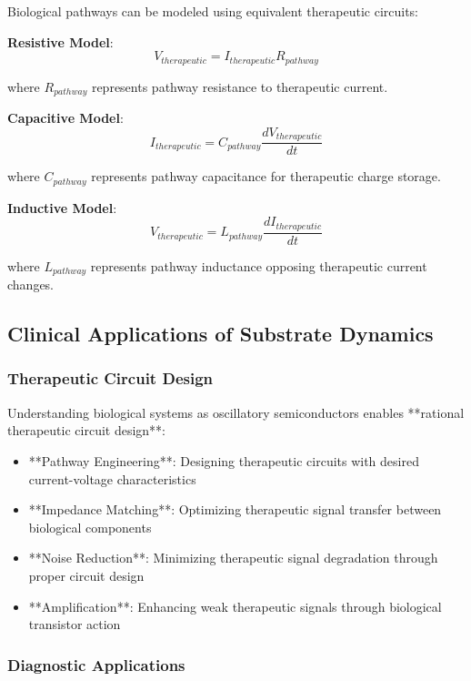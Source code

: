 Biological pathways can be modeled using equivalent therapeutic circuits:

\textbf{Resistive Model}:
\begin{equation}
V_{therapeutic} = I_{therapeutic} R_{pathway}
\end{equation}

where $R_{pathway}$ represents pathway resistance to therapeutic current.

\textbf{Capacitive Model}:
\begin{equation}
I_{therapeutic} = C_{pathway} \frac{dV_{therapeutic}}{dt}
\end{equation}

where $C_{pathway}$ represents pathway capacitance for therapeutic charge storage.

\textbf{Inductive Model}:
\begin{equation}
V_{therapeutic} = L_{pathway} \frac{dI_{therapeutic}}{dt}
\end{equation}

where $L_{pathway}$ represents pathway inductance opposing therapeutic current changes.

\subsection{Clinical Applications of Substrate Dynamics}

\subsubsection{Therapeutic Circuit Design}

Understanding biological systems as oscillatory semiconductors enables **rational therapeutic circuit design**:

\begin{itemize}
\item **Pathway Engineering**: Designing therapeutic circuits with desired current-voltage characteristics
\item **Impedance Matching**: Optimizing therapeutic signal transfer between biological components
\item **Noise Reduction**: Minimizing therapeutic signal degradation through proper circuit design
\item **Amplification**: Enhancing weak therapeutic signals through biological transistor action
\end{itemize}

\subsubsection{Diagnostic Applications}

